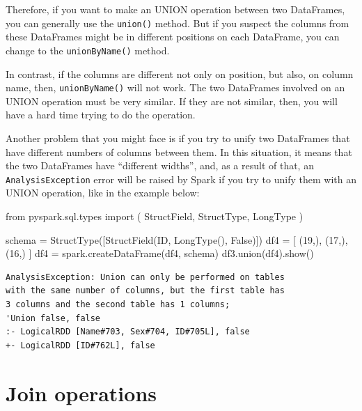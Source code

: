 \documentclass[
  11pt,
  letterpaper,
  DIV=11,
  numbers=noendperiod]{scrreprt}
\newenvironment{Shaded}{\begin{snugshade}}{\end{snugshade}}
\newcommand{\DecValTok}[1]{\textcolor[rgb]{0.68,0.00,0.00}{#1}}
\newcommand{\ImportTok}[1]{\textcolor[rgb]{0.00,0.46,0.62}{#1}}
\newcommand{\NormalTok}[1]{\textcolor[rgb]{0.00,0.23,0.31}{#1}}
\newcommand{\OperatorTok}[1]{\textcolor[rgb]{0.37,0.37,0.37}{#1}}
\newcommand{\StringTok}[1]{\textcolor[rgb]{0.13,0.47,0.30}{#1}}
\newcommand{\VariableTok}[1]{\textcolor[rgb]{0.07,0.07,0.07}{#1}}
\begin{document}
Therefore, if you want to make an UNION operation between two
DataFrames, you can generally use the \texttt{union()} method. But if
you suspect the columns from these DataFrames might be in different
positions on each DataFrame, you can change to the
\texttt{unionByName()} method.

In contrast, if the columns are different not only on position, but
also, on column name, then, \texttt{unionByName()} will not work. The
two DataFrames involved on an UNION operation must be very similar. If
they are not similar, then, you will have a hard time trying to do the
operation.

Another problem that you might face is if you try to unify two
DataFrames that have different numbers of columns between them. In this
situation, it means that the two DataFrames have ``different widths'',
and, as a result of that, an \texttt{AnalysisException} error will be
raised by Spark if you try to unify them with an UNION operation, like
in the example below:

\begin{Shaded}
\begin{Highlighting}[]
\ImportTok{from}\NormalTok{ pyspark.sql.types }\ImportTok{import}\NormalTok{ (}
\NormalTok{    StructField,}
\NormalTok{    StructType,}
\NormalTok{    LongType}
\NormalTok{)}

\NormalTok{schema }\OperatorTok{=}\NormalTok{ StructType([StructField(}\StringTok{\textquotesingle{}ID\textquotesingle{}}\NormalTok{, LongType(), }\VariableTok{False}\NormalTok{)])}
\NormalTok{df4 }\OperatorTok{=}\NormalTok{ [}
\NormalTok{    (}\DecValTok{19}\NormalTok{,), (}\DecValTok{17}\NormalTok{,), (}\DecValTok{16}\NormalTok{,)}
\NormalTok{]}
\NormalTok{df4 }\OperatorTok{=}\NormalTok{ spark.createDataFrame(df4, schema)}
\NormalTok{df3.union(df4).show()}
\end{Highlighting}
\end{Shaded}

\begin{verbatim}
AnalysisException: Union can only be performed on tables
with the same number of columns, but the first table has
3 columns and the second table has 1 columns;
'Union false, false
:- LogicalRDD [Name#703, Sex#704, ID#705L], false
+- LogicalRDD [ID#762L], false
\end{verbatim}

\section{Join operations}\label{join-operations}
\end{document}
